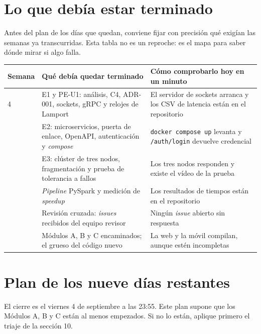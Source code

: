 \documentclass[11pt,a4paper]{article}
\begin{document}
\section{Lo que debía estar terminado}

Antes del plan de los días que quedan, conviene fijar con precisión qué exigían las semanas ya transcurridas. Esta tabla no es un reproche: es el mapa para saber dónde mirar si algo falla.

\begin{center}
	\small
	\begin{tabular}{@{}p{1.8cm}p{5.8cm}p{7.3cm}@{}}
		\toprule
		\textbf{Semana} & \textbf{Qué debía quedar terminado} & \textbf{Cómo comprobarlo hoy en un minuto} \\
		\midrule
		4 & E1 y PE-U1: análisis, C4, ADR-001, sockets, gRPC y relojes de Lamport & El servidor de sockets arranca y los CSV de latencia están en el repositorio \\
		\addlinespace
		7 & E2: microservicios, puerta de enlace, OpenAPI, autenticación y \emph{compose} & \texttt{docker compose up} levanta y \texttt{/auth/login} devuelve credencial \\
		\addlinespace
		11 & E3: clúster de tres nodos, fragmentación y prueba de tolerancia a fallos & Los tres nodos responden y existe el vídeo de la prueba \\
		\addlinespace
		14 & \emph{Pipeline} PySpark y medición de \emph{speedup} & Los resultados de tiempos están en el repositorio \\
		\addlinespace
		16 & Revisión cruzada: \emph{issues} recibidos del equipo revisor & Ningún \emph{issue} abierto sin respuesta \\
		\addlinespace
		17 & Módulos A, B y C encaminados; el grueso del código nuevo & La web y la móvil compilan, aunque estén incompletas \\
		\bottomrule
	\end{tabular}
\end{center}

\section{Plan de los nueve días restantes}

El cierre es el viernes 4 de septiembre a las 23:55. Este plan supone que los Módulos A, B y C están al menos empezados. Si no lo están, aplique primero el triaje de la sección 10.
\end{document}

